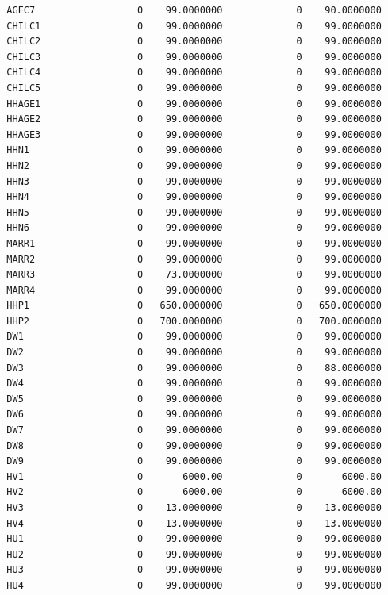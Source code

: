 \documentclass[
  11pt,
  a4paper,
  DIV=12,captions=tableheading,oneside,titlepage]{scrbook}
\begin{document}
\begin{verbatim}
  AGEC7                  0    99.0000000             0    90.0000000 
  CHILC1                 0    99.0000000             0    99.0000000 
  CHILC2                 0    99.0000000             0    99.0000000 
  CHILC3                 0    99.0000000             0    99.0000000 
  CHILC4                 0    99.0000000             0    99.0000000 
  CHILC5                 0    99.0000000             0    99.0000000 
  HHAGE1                 0    99.0000000             0    99.0000000 
  HHAGE2                 0    99.0000000             0    99.0000000 
  HHAGE3                 0    99.0000000             0    99.0000000 
  HHN1                   0    99.0000000             0    99.0000000 
  HHN2                   0    99.0000000             0    99.0000000 
  HHN3                   0    99.0000000             0    99.0000000 
  HHN4                   0    99.0000000             0    99.0000000 
  HHN5                   0    99.0000000             0    99.0000000 
  HHN6                   0    99.0000000             0    99.0000000 
  MARR1                  0    99.0000000             0    99.0000000 
  MARR2                  0    99.0000000             0    99.0000000 
  MARR3                  0    73.0000000             0    99.0000000 
  MARR4                  0    99.0000000             0    99.0000000 
  HHP1                   0   650.0000000             0   650.0000000 
  HHP2                   0   700.0000000             0   700.0000000 
  DW1                    0    99.0000000             0    99.0000000 
  DW2                    0    99.0000000             0    99.0000000 
  DW3                    0    99.0000000             0    88.0000000 
  DW4                    0    99.0000000             0    99.0000000 
  DW5                    0    99.0000000             0    99.0000000 
  DW6                    0    99.0000000             0    99.0000000 
  DW7                    0    99.0000000             0    99.0000000 
  DW8                    0    99.0000000             0    99.0000000 
  DW9                    0    99.0000000             0    99.0000000 
  HV1                    0       6000.00             0       6000.00 
  HV2                    0       6000.00             0       6000.00 
  HV3                    0    13.0000000             0    13.0000000 
  HV4                    0    13.0000000             0    13.0000000 
  HU1                    0    99.0000000             0    99.0000000 
  HU2                    0    99.0000000             0    99.0000000 
  HU3                    0    99.0000000             0    99.0000000 
  HU4                    0    99.0000000             0    99.0000000 

\end{verbatim}
\end{document}
